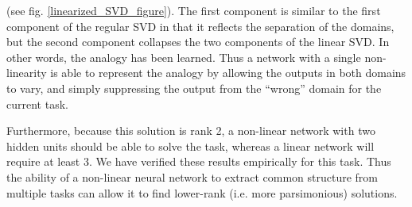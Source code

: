 \documentclass[10pt,letterpaper]{article}
\begin{document}
(see fig. \ref{linearized_SVD_figure}). The first component is similar to the first component of the regular SVD in that it reflects the separation of the domains, but the second component collapses the two components of the linear SVD. In other words, the analogy has been learned. Thus a network with a single non-linearity is able to represent the analogy by allowing the outputs in both domains to vary, and simply suppressing the output from the ``wrong'' domain for the current task.\par
Furthermore, because this solution is rank 2, a non-linear network with two hidden units should be able to solve the task, whereas a linear network will require at least 3. We have verified these results empirically for this task. Thus the ability of a non-linear neural network to extract common structure from multiple tasks can allow it to find lower-rank (i.e. more parsimonious) solutions. 
\end{document}
